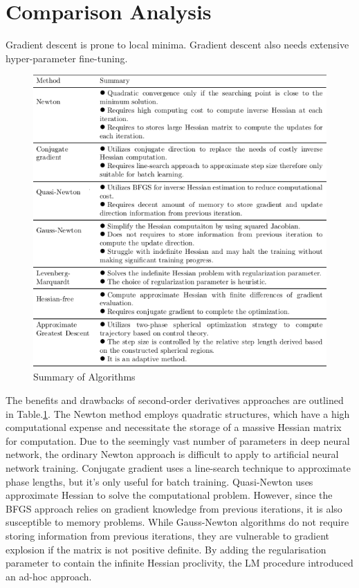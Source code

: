 \documentclass[journal]{IEEEtran}
\begin{document}
\section{Comparison Analysis}
 Gradient descent is prone to local minima. Gradient descent also needs extensive hyper-parameter fine-tuning. \\
 
 \begin{figure}%
\centering
\includegraphics[width=1\linewidth]{Figures/summary}
\caption{Summary of Algorithms}
\label{Comparison}
\end{figure}


 The benefits and drawbacks of second-order derivatives approaches are outlined in Table.\ref{Comparison}. The Newton method employs quadratic structures, which have a high computational expense and necessitate the storage of a massive Hessian matrix for computation. Due to the seemingly vast number of parameters in deep neural network, the ordinary Newton approach is difficult to apply to artificial neural network training. Conjugate gradient uses a line-search technique to approximate phase lengths, but it's only useful for batch training. Quasi-Newton uses approximate Hessian to solve the computational problem. However, since the BFGS approach relies on gradient knowledge from previous iterations, it is also susceptible to memory problems. While Gauss-Newton algorithms do not require storing information from previous iterations, they are vulnerable to gradient explosion if the matrix is not positive definite. By adding the regularisation parameter to contain the infinite Hessian proclivity, the LM procedure introduced an ad-hoc approach.
\end{document}
